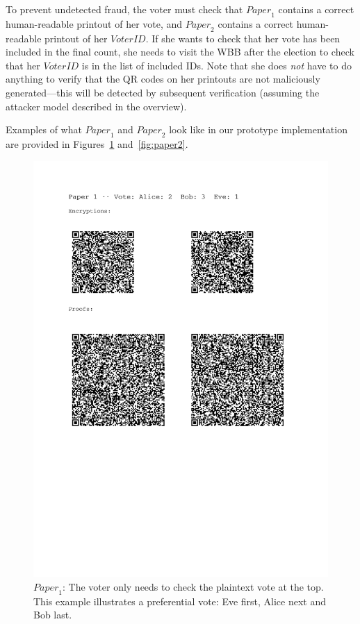 \documentclass[12pt,a4paper]{article}
\theoremstyle{definition}
\newcommand{\VoterID}{\mathit{VoterID}}
\newcommand{\Paper}{\mathit{Paper}}
\begin{document}
To prevent undetected fraud, the voter must check that $\Paper_1$ contains a correct human-readable printout of her vote, and $\Paper_2$ contains a correct human-readable printout of her $\VoterID$. If she wants to check that her vote has been included in the final count, she needs to visit the WBB after the election to check that her $\VoterID$ is in the list of included IDs.  Note that she does \emph{not} have to do anything to verify that the QR codes on her printouts are not maliciously generated---this will be detected by subsequent verification (assuming the attacker model described in the overview).

Examples of what $\Paper_1$ and $\Paper_2$ look like in our prototype implementation are provided in Figures~\ref{fig:paper1} and~\ref{fig:paper2}.

\begin{figure}
	\centering
	\includegraphics[scale=0.6, trim=2.5cm 10cm 3.1cm 0cm, clip=true]{paper1.pdf}
	\caption{$\Paper_1$: The voter only needs to check the plaintext vote at the top.  This example illustrates a preferential vote: Eve first, Alice next and Bob last.}
	\label{fig:paper1}
\end{figure}
\end{document}
